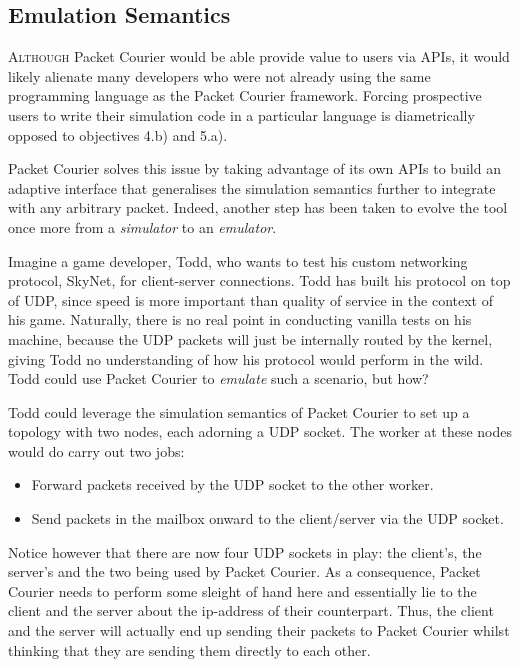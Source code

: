 \subsection{Emulation Semantics}\label{subsection:emulation_semantics}

\lettrine{A}{lthough} Packet Courier would be able provide value to users via APIs, it would likely alienate many
developers who were not already using the same programming language as the Packet Courier framework. Forcing
prospective users to write their simulation code in a particular language is diametrically opposed to objectives 4.b)
and 5.a).

Packet Courier solves this issue by taking advantage of its own APIs to build an adaptive interface that generalises
the simulation semantics further to integrate with any arbitrary packet. Indeed, another step has been taken to
evolve the tool once more from a \emph{simulator} to an \emph{emulator}.

Imagine a game developer, Todd, who wants to test his custom networking protocol, SkyNet, for client-server
connections. Todd has built his protocol on top of UDP, since speed is more important than quality of service in the
context of his game. Naturally, there is no real point in conducting vanilla tests on his machine, because the UDP
packets will just be internally routed by the kernel, giving Todd no understanding of how his protocol would perform
in the wild. Todd could use Packet Courier to \emph{emulate} such a scenario, but how?

Todd could leverage the simulation semantics of Packet Courier to set up a topology with two nodes, each adorning a UDP
socket. The worker at these nodes would do carry out two jobs:
\begin{itemize}
    \item Forward packets received by the UDP socket to the other worker.
    \item Send packets in the mailbox onward to the client/server via the UDP socket.
\end{itemize}

Notice however that there are now four UDP sockets in play: the client's, the server's and the two being used by
Packet Courier. As a consequence, Packet Courier needs to perform some sleight of hand here and essentially lie to
the client and the server about the ip-address of their counterpart. Thus, the client and the server will actually
end up sending their packets to Packet Courier whilst thinking that they are sending them directly to each other.

